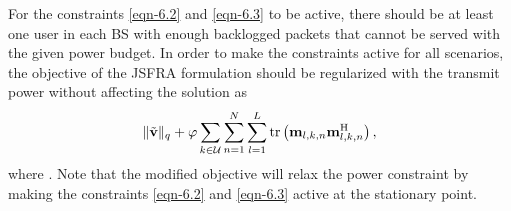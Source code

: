 \begin{comment}
Since the allocated rate of user \me{j} is less than the queued packets, we can find a precoder \me{\mvec{m}{j}} with the additional power of \me{\Delta P} as \me{\mvec{m}{j}^\prime = \bar{\mbf{m}}_{j} + \mvec{V}{j} \mbf{e}^\prime}. Note that the new precoder has no impact on the interference constraint of other users. The newly found precoder \me{\mvec{m}{j}^\prime} minimize the queue of user \me{j} without affecting the rates of other user, there by reduces the objective further. It is in contradiction to our original assumption that the precoders are optimal and the objective is minimum. 

It can be seen that the constraints are tight as long as there is one user with unserviced backlogged packets at each \ac{BS} with the given power budget. Since the objective is not to minimize power, when the power budget is more than sufficient to service the backlogged packets of all users, the \ac{JSFRA} scheme is not guaranteed to find the minimum power precoders to empty the current backlogged packets in the system. The objective of the \ac{JSFRA} problem can be regularized by including the power term to find the minimum power precoders as
\begin{equation*}
\| \tilde{\mbf{v}} \|_q + \varphi \sum_{k \in \mc{U}} \sum_{n = 1}^{N} \sum_{l=1}^{L} \mathrm{tr} \left ( \mvec{m}{l,k,n} \mbf{m}^\herm_{l,k,n} \right ),
\end{equation*}
for a small \me{\varphi} without affecting the optimal solution. Note that the above objective is guaranteed to make the constraints \eqref{eqn-6.2} and \eqref{eqn-6.3} active by relaxing the power constraint \eqref{eqn-6.4}.
\end{comment}

For the constraints \eqref{eqn-6.2} and \eqref{eqn-6.3} to be active, there should be at least one user in each \ac{BS} with enough backlogged packets that cannot be served with the given power budget. In order to make the constraints active for all scenarios, the objective of the \ac{JSFRA} formulation should be regularized with the transmit power without affecting the solution as
\begin{equation*}
\| \tilde{\mathbf{v}} \|_q + \varphi \sum_{k \in \mathcal{U}} \sum_{n = 1}^{N} \sum_{l=1}^{L} \mathrm{tr} \left ( \mathbf{m}_{l,k,n} \mathbf{m}^{\mathrm{H}}_{l,k,n} \right ),
\end{equation*}
where . Note that the modified objective will relax the power constraint by making the constraints \eqref{eqn-6.2} and \eqref{eqn-6.3} active at the stationary point.

